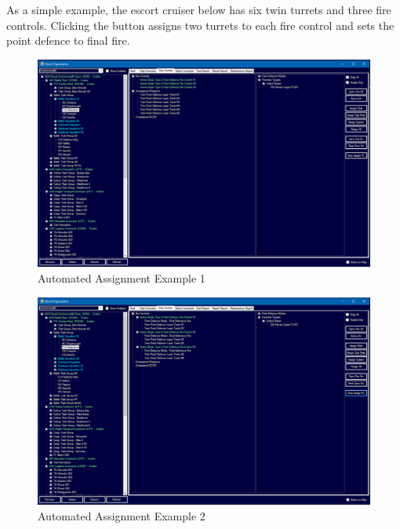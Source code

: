 \documentclass[../../Aurora C# unofficial manual.tex]{subfiles}
\begin{document}
	As a simple example, the escort cruiser below has six twin turrets and three fire controls. Clicking the button assigns two turrets to each fire control and sets the point defence to final fire.
	\begin{figure}[H]
		\centering
		\includegraphics[width=0.95\linewidth]{images/AutomatedAssignment}
		\caption[Automated Assignment]{Automated Assignment Example 1}
		\label{fig:automatedassignment}
	\end{figure}
	\begin{figure}[H]
		\centering
		\includegraphics[width=0.95\linewidth]{images/AutomatedAssignment2}
		\caption[Automated Assignment]{Automated Assignment Example 2}
		\label{fig:automatedassignment2}
	\end{figure}
	
\end{document}
